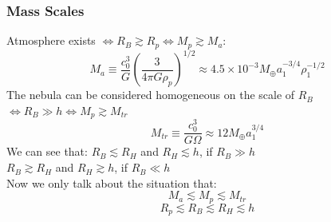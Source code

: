 \documentclass{beamer}
\begin{document}
\begin{frame}
\frametitle{Mass Scales}
Atmosphere exists $\iff R_B \gtrsim R_p \iff M_p \gtrsim M_a$:
\begin{equation}
M_a \equiv \frac{c_0^3}{G}\left( \frac{3}{4 \pi G \rho_p} \right)^{1/2} \approx 4.5 \times 10^{-3} M_{\oplus} a_1^{-3/4} \rho_1^{-1/2}
\end{equation}
The nebula can be considered homogeneous on the scale of $R_B$ \\
$\iff R_B \gg h \iff M_p \gtrsim M_{tr}$
\begin{equation}
M_{tr} \equiv \frac{c_0^3}{G \Omega} \approx 12 M_{\oplus} a_1^{3/4}
\end{equation}
We can see that: $R_B \lesssim R_H$ and $R_H \lesssim h$, if $R_B \gg h$ \\
$R_B \gtrsim R_H$ and $R_H \gtrsim h$, if $R_B \ll h$ \\
Now we only talk about the situation that:
\begin{equation}
M_a \lesssim M_p \lesssim M_{tr}
\end{equation}
\begin{equation}
R_p \lesssim R_B \lesssim R_H \lesssim h
\end{equation}
\end{frame}
\end{document}

